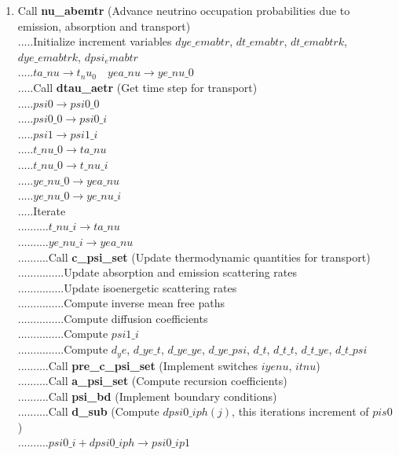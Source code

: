 \documentclass[11pt,doublespace]{article}
\begin{document}
\begin{itemize}
\begin{enumerate}
\begin{enumerate}
\begin{enumerate}
\begin{enumerate}
  \item Call {\bf nu\_abemtr} (Advance neutrino occupation probabilities due to emission, absorption and transport)\\
 .....Initialize increment variables $dye\_emabtr$, $dt\_emabtr$, $dt\_emabtrk$, $dye\_emabtrk$, $dpsi_emabtr$\\
 .....$ta\_nu \rightarrow t_nu_0 \quad yea\_nu \rightarrow ye\_nu\_0$\\
 .....Call {\bf dtau\_aetr} (Get time step for transport)\\
 .....$psi0 \rightarrow psi0\_0$\\
 .....$psi0\_0 \rightarrow psi0\_i$\\
 .....$psi1 \rightarrow psi1\_i$\\
 .....$t\_nu\_0 \rightarrow ta\_nu$\\
 .....$t\_nu\_0 \rightarrow t\_nu\_i$\\
 .....$ye\_nu\_0 \rightarrow yea\_nu$\\
 .....$ye\_nu\_0 \rightarrow ye\_nu\_i$\\
 .....Iterate\\
..........$t\_nu\_i \rightarrow ta\_nu$\\
..........$ye\_nu\_i \rightarrow yea\_nu$\\
..........Call {\bf c\_psi\_set} (Update thermodynamic quantities for transport)\\
...............Update absorption and emission scattering rates\\
...............Update isoenergetic scattering rates\\
...............Compute inverse mean free paths\\
...............Compute diffusion coefficients\\
...............Compute $psi1\_i$\\
...............Compute $d_ye$, $d\_ye\_t$, $d\_ye\_ye$, $d\_ye\_psi$, $d\_t$, $d\_t\_t$, $d\_t\_ye$, $d\_t\_psi$\\
..........Call {\bf pre\_c\_psi\_set} (Implement switches $iyenu$, $itnu$)\\
..........Call {\bf a\_psi\_set} (Compute recursion coefficients)\\
..........Call {\bf psi\_bd} (Implement boundary conditions)\\
..........Call {\bf d\_sub} (Compute $dpsi0\_iph(j)$, this iterations increment of $pis0$)\\
..........$psi0\_i + dpsi0\_iph \rightarrow psi0\_ip1$\\

\end{enumerate}
\end{enumerate}
\end{enumerate}
\end{enumerate}
\end{itemize}
\end{document}

